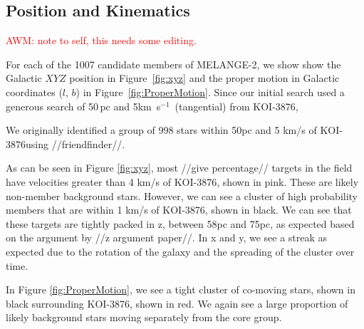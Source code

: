 \documentclass[twocolumn]{aastex631}
\newcommand{\starname}{KOI-3876}
\newcommand\kms{km~s$^{-1}$}
\begin{document}
\subsection{Position and Kinematics}


\textcolor{red}{AWM: note to self, this needs some editing. }

For each of the 1007 candidate members of MELANGE-2, we show show the Galactic $XYZ$ position in Figure~\ref{fig:xyz} and the proper motion in Galactic coordinates ($l$, $b$) in Figure~\ref{fig:ProperMotion}. Since our initial search used a generous search of 50\,pc and 5\kms\ (tangential) from \starname, 

We originally identified a group of 998 stars within 50pc and 5 km/s of \starname using //friendfinder//. 

As can be seen in Figure \ref{fig:xyz}, most //give percentage// targets in the field have velocities greater than 4 km/s of \starname, shown in pink. These are likely non-member background stars. However, we can see a cluster of high probability members that are within 1 km/s of \starname, shown in black. We can see that these targets are tightly packed in z, between 58pc and 75pc, as expected based on the argument by //z argument paper//. In x and y, we see a streak as expected due to the rotation of the galaxy and the spreading of the cluster over time.

In Figure \ref{fig:ProperMotion}, we see a tight cluster of co-moving stars, shown in black surrounding \starname, shown in red. We again see a large proportion of likely background stars moving separately from the core group.
\end{document}
